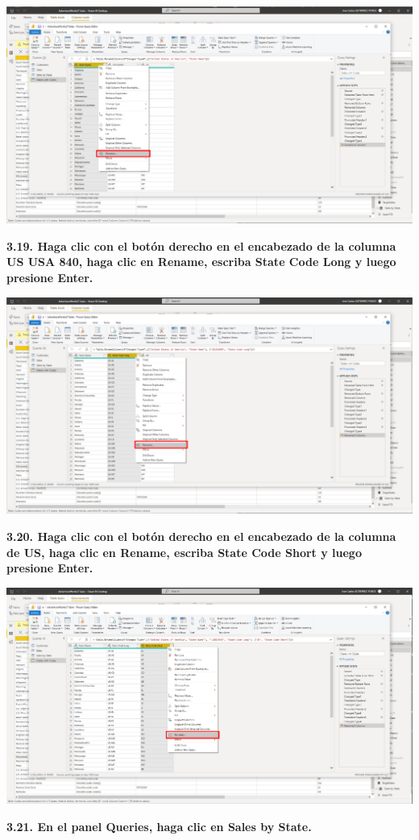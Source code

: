 \documentclass{article}
\begin{document}
    \begin{center}
		\includegraphics[width=14cm]{./images/66} 
	\end{center}
\newpage
\textbf{3.19. Haga clic con el botón derecho en el encabezado de la columna \textbf{US USA 840}, haga clic en \textbf{Rename}, escriba \textbf{State Code Long} y luego presione Enter.}

    \begin{center}
		\includegraphics[width=14cm]{./images/67} 
	\end{center}

\textbf{3.20. Haga clic con el botón derecho en el encabezado de la columna de \textbf{US}, haga clic en \textbf{Rename}, escriba \textbf{State Code Short} y luego presione Enter.}

    \begin{center}
		\includegraphics[width=14cm]{./images/68} 
	\end{center}
\newpage
\textbf{3.21. En el panel \textbf{Queries}, haga clic en \textbf{Sales by State}.}
\end{document}

